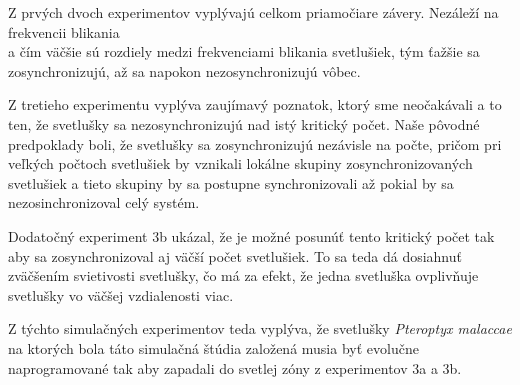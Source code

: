 \documentclass[a4paper, 11pt]{article}
\begin{document}
Z prvých dvoch experimentov vyplývajú celkom priamočiare závery. Nezáleží na frekvencii blikania\\ a čím väčšie sú rozdiely medzi frekvenciami blikania svetlušiek, tým ťažšie sa zosynchronizujú, až sa napokon nezosynchronizujú vôbec.

Z tretieho experimentu vyplýva zaujímavý poznatok, ktorý sme neočakávali a to ten, že svetlušky sa nezosynchronizujú nad istý kritický počet. Naše pôvodné predpoklady boli, že svetlušky sa zosynchronizujú nezávisle na počte, pričom pri veľkých počtoch svetlušiek by vznikali lokálne skupiny zosynchronizovaných svetlušiek a tieto skupiny by sa postupne synchronizovali až pokial by sa nezosinchronizoval celý systém.


Dodatočný experiment 3b ukázal, že je možné posunúť tento kritický počet tak aby sa zosynchronizoval aj väčší počet svetlušiek. To sa teda dá dosiahnuť zväčšením svietivosti svetlušky, čo má za efekt, že jedna svetluška ovplivňuje svetlušky vo väčšej vzdialenosti viac.

Z týchto simulačných experimentov teda vyplýva, že svetlušky \textit{Pteroptyx malaccae} na ktorých bola táto simulačná štúdia založená musia byť evolučne naprogramované tak aby zapadali do svetlej zóny z experimentov 3a a 3b.








\pagebreak




        






\pagebreak


\end{document}
